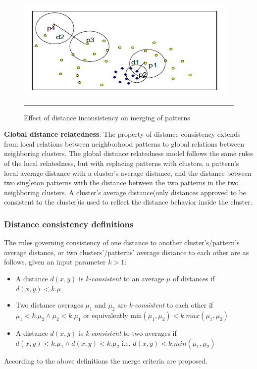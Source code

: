 \begin{figure}[htbp]
	\centering
		\includegraphics{./Figures/Mitosis_2.png}
		\rule{35em}{0.5pt}
	\caption[Effect of distance inconsistency on merging of patterns]{Effect of distance inconsistency on merging of patterns}
	\label{fig:mitosis_2}
\end{figure}


\textbf{Global distance relatedness}: The property of distance consistency
extends from local relations between neighborhood patterns to global relations between neighboring clusters. The global distance relatedness model follows the same rules of the local relatedness, but with replacing patterns with clusters, a pattern's local average distance with a cluster's average distance, and the distance between two singleton patterns with the distance between the two patterns in the two neighboring clusters. A cluster's average distance(only distances approved to be consistent to the cluster)is used to reflect the distance behavior inside the cluster.

\subsubsection{Distance consistency definitions}
The rules governing consistency of one distance to another cluster's/pattern's average distance, or two clusters'/patterns' average
distance to each other are as follows. given an input parameter $k > 1$:
\begin{itemize}
\item A distance $d(x,y)$ is \textit{k-consistent} to an average $\mu$ of distances if
$d(x, y)<k. \mu$
\item Two distance averages $\mu_1$ and $\mu_2$ are \textit{k-consistent} to each other if $\mu_1 < k.\mu_2 \wedge \mu_2 <k.\mu_1$ or equivalently min$(\mu_1, \mu_2)< k.max(\mu_1, \mu_2)$
\item A distance $d(x,y)$ is \textit{k-consistent} to two averages if $d(x, y)< k.\mu_1 \wedge d(x, y)< k.\mu_2$  i.e. $d(x, y)< k.min(\mu_1, \mu_2)$
\end{itemize}
According to the above definitions the merge criteria are proposed.

